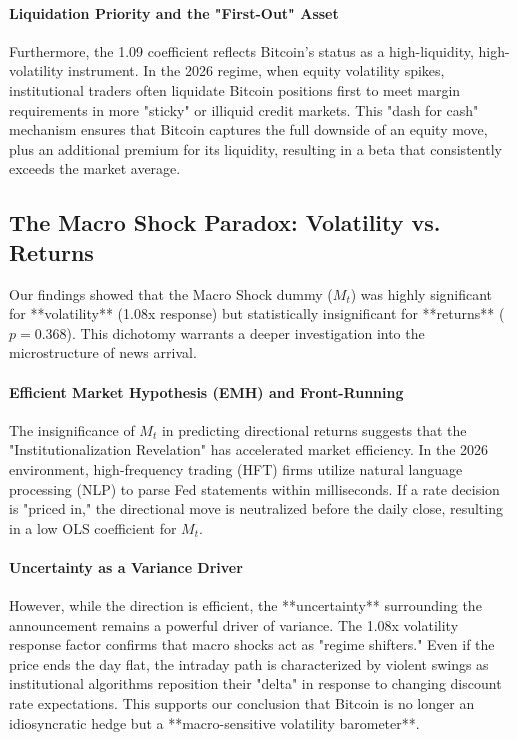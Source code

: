 \documentclass[10pt, conference, compsocconf]{IEEEtran}
\begin{document}
\paragraph{Liquidation Priority and the "First-Out" Asset}
Furthermore, the 1.09 coefficient reflects Bitcoin’s status as a high-liquidity, high-volatility instrument. In the 2026 regime, when equity volatility spikes, institutional traders often liquidate Bitcoin positions first to meet margin requirements in more "sticky" or illiquid credit markets. This "dash for cash" mechanism ensures that Bitcoin captures the full downside of an equity move, plus an additional premium for its liquidity, resulting in a beta that consistently exceeds the market average.


\subsection{The Macro Shock Paradox: Volatility vs. Returns}

Our findings showed that the Macro Shock dummy ($M_t$) was highly significant for **volatility** (1.08x response) but statistically insignificant for **returns** ($p = 0.368$). This dichotomy warrants a deeper investigation into the microstructure of news arrival.

\paragraph{Efficient Market Hypothesis (EMH) and Front-Running}
The insignificance of $M_t$ in predicting directional returns suggests that the "Institutionalization Revelation" has accelerated market efficiency. In the 2026 environment, high-frequency trading (HFT) firms utilize natural language processing (NLP) to parse Fed statements within milliseconds. If a rate decision is "priced in," the directional move is neutralized before the daily close, resulting in a low OLS coefficient for $M_t$. 

\paragraph{Uncertainty as a Variance Driver}
However, while the direction is efficient, the **uncertainty** surrounding the announcement remains a powerful driver of variance. The 1.08x volatility response factor confirms that macro shocks act as "regime shifters." Even if the price ends the day flat, the intraday path is characterized by violent swings as institutional algorithms reposition their "delta" in response to changing discount rate expectations. This supports our conclusion that Bitcoin is no longer an idiosyncratic hedge but a **macro-sensitive volatility barometer**.
\end{document}
